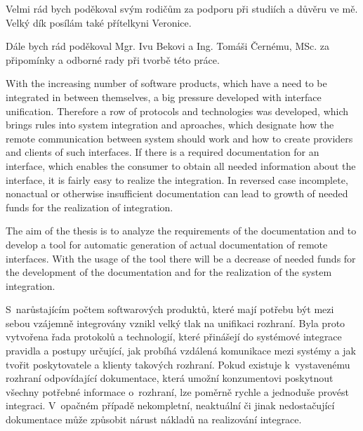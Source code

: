 \documentclass[11pt,twoside,a4paper]{book}
\begin{document}

\coverpagestarts


\acknowledgements
\noindent
Velmi rád bych poděkoval svým rodičům za podporu při studiích a důvěru ve mě.
Velký dík posílám také přítelkyni Veronice. 

Dále bych rád poděkoval Mgr.
Ivu Bekovi a Ing. Tomáši Černému, MSc. za připomínky a odborné rady při tvorbě
této práce.





 
\abstractpage

With the increasing number of software products, which have a need to be
integrated in between themselves, a big pressure developed with interface
unification. Therefore a row of protocols and technologies was developed, which
brings rules into system integration and aproaches, which designate how the
remote communication between system should work and how to create providers and
clients of such interfaces.
If there is a required documentation for an interface, which enables the
consumer to obtain all needed information about the interface, it is fairly easy
to realize the integration. In reversed case incomplete, nonactual or otherwise
insufficient documentation can lead to growth of needed funds for the
realization of integration.

The aim of the thesis is to analyze the requirements of the documentation and to
develop a tool for automatic generation of actual documentation of remote
interfaces. With the usage of the tool there will be a decrease of needed funds
for the development of the documentation and for the realization of the system
integration.


\baselineskip
S~narůstajícím počtem softwarových produktů, které mají potřebu být mezi sebou vzájemně
integrovány vznikl velký tlak na unifikaci rozhraní. Byla proto vytvořena řada protokolů a
technologií, které přinášejí do systémové integrace pravidla a postupy určující,
jak probíhá vzdálená komunikace mezi systémy a jak tvořit poskytovatele a klienty takových rozhraní.
Pokud existuje k~vystavenému rozhraní odpovídající dokumentace, která umožní
konzumentovi poskytnout všechny potřebné informace o~rozhraní, lze poměrně rychle a
jednoduše provést integraci. V~opačném případě nekompletní, neaktuální či jinak
nedostačující dokumentace může způsobit nárust nákladů na realizování integrace.
\end{document}

